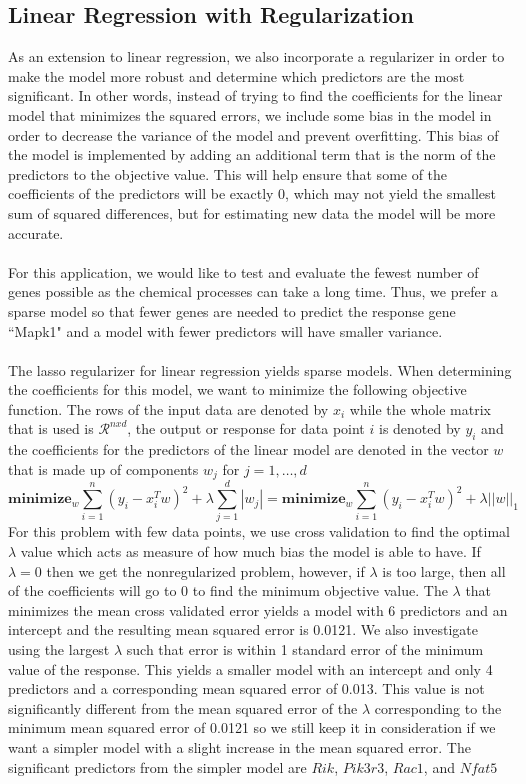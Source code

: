 \documentclass{article}
\begin{document}
\subsection{Linear Regression with Regularization}
As an extension to linear regression, we also incorporate a regularizer in order to make the model more robust and determine which predictors are the most significant.  In other words, instead of trying to find the coefficients for the linear model that minimizes the squared errors, we include some bias in the model in order to decrease the variance of the model and prevent overfitting.  This bias of the model is implemented by adding an additional term that is the norm of the predictors to the objective value. This will help ensure that some of the coefficients of the predictors will be exactly $0$, which may not yield the smallest sum of squared differences, but for estimating new data the model will be more accurate. \\
\null\\
For this application, we would like to test and evaluate the fewest number of genes possible as the chemical processes can take a long time.  Thus, we prefer a sparse model so that fewer genes are needed to predict the response gene ``Mapk1" and a model with fewer predictors will have smaller variance.\\
\null\\
The lasso regularizer for linear regression yields sparse models.  When determining the coefficients for this model, we want to minimize the following objective function.  The rows of the input data are denoted by $x_i$ while the whole matrix that is used is $\mathcal{R}^{nxd}$, the output or response for data point $i$ is denoted by $y_i$ and the coefficients for the predictors of the linear model are denoted in the vector $w$ that is made up of components $w_j$ for $j=1,\dots,d$
\begin{equation}
	\textbf{minimize}_w \sum_{i=1}^n(y_i-x_i^Tw)^2+\lambda\sum_{j=1}^d |w_j| = \textbf{minimize}_w \sum_{i=1}^n(y_i-x_i^Tw)^2+\lambda||w||_1
\end{equation}
For this problem with few data points, we use cross validation to find the optimal $\lambda$ value which acts as measure of how much bias the model is able to have.  If $\lambda = 0$ then we get the nonregularized problem, however, if $\lambda$ is too large, then all of the coefficients will go to $0$ to find the minimum objective value.  The $\lambda$ that minimizes the mean cross validated error yields a model with 6 predictors and an intercept and the resulting mean squared error is 0.0121.  We also investigate using the largest $\lambda$ such that error is within 1 standard error of the minimum value of the response.  This yields a smaller model with an intercept and only 4 predictors and a corresponding mean squared error of 0.013. This value is not significantly different from the mean squared error of the $\lambda$ corresponding to the minimum mean squared error of 0.0121 so we still keep it in consideration if we want a simpler model with a slight increase in the mean squared error.  The significant predictors from the simpler model are $Rik$, $Pik3r3$, $Rac1$, and $Nfat5$
\end{document}
